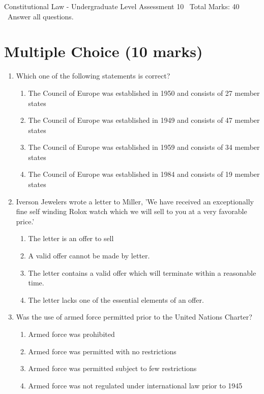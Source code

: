 \documentclass[12pt]{article}
\begin{document}
\begin{center}
Constitutional Law - Undergraduate Level Assessment 10 \
Total Marks: 40 \
Answer all questions.
\end{center}

\section*{Multiple Choice (10 marks)}
\begin{enumerate}[label=\arabic*.]
\item Which one of the following statements is correct?
\begin{enumerate}[label=(\alph*)]
    \item The Council of Europe was established in 1950 and consists of 27 member states
    \item The Council of Europe was established in 1949 and consists of 47 member states
    \item The Council of Europe was established in 1959 and consists of 34 member states
    \item The Council of Europe was established in 1984 and consists of 19 member states
\end{enumerate}
\item Iverson Jewelers wrote a letter to Miller, 'We have received an exceptionally fine self winding Rolox watch which we will sell to you at a very favorable price.'
\begin{enumerate}[label=(\alph*)]
    \item The letter is an offer to sell
    \item A valid offer cannot be made by letter.
    \item The letter contains a valid offer which will terminate within a reasonable time.
    \item The letter lacks one of the essential elements of an offer.
\end{enumerate}
\item Was the use of armed force permitted prior to the United Nations Charter?
\begin{enumerate}[label=(\alph*)]
    \item Armed force was prohibited
    \item Armed force was permitted with no restrictions
    \item Armed force was permitted subject to few restrictions
    \item Armed force was not regulated under international law prior to 1945

\end{enumerate}
\end{enumerate}
\end{document}
